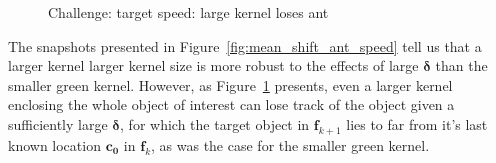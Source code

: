 \begin{figure}
    \caption{Challenge: target speed: large kernel loses ant\label{fig:mean_shift_ant_speed2}}
\end{figure}

The snapshots presented in Figure~\ref{fig:mean_shift_ant_speed} tell us
that a larger kernel larger kernel size is more robust to the effects of large
$\mathbf{\delta}$ than the smaller green kernel. However, as
Figure~\ref{fig:mean_shift_ant_speed2} presents, even a larger
kernel enclosing the whole object of interest can lose track of the object given
a sufficiently large $\mathbf{\delta}$, for which the target object in $\mathbf{f}_{k+1}$ lies
to far from it's last known location $\mathbf{c_0}$ in $\mathbf{f}_k$, as was
the case for the smaller green kernel. 

